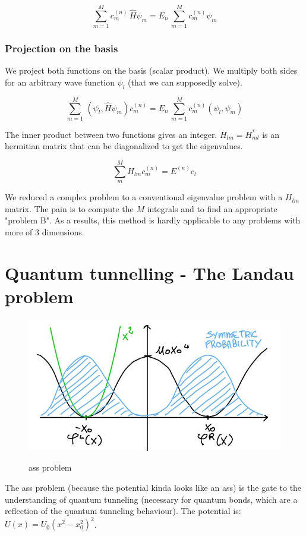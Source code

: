 		$$\sum_{m=1}^{M}c_m^{(n)}\,\hat{H}\psi_m=E_n\,\sum_{m=1}^{M}c_m^{(n)}\psi_m$$

		\subsubsection{Projection on the basis}
		We project both functions on the basis (scalar product).
		We multiply both sides for an arbitrary wave function $\psi_l$ (that we can supposedly solve).

		$$\sum_{m=1}^{M}\,(\psi_l,\hat{H}\psi_m)c_m^{(n)}=E_n\,\sum_{m=1}^{M}c_m^{(n)}(\psi_l,\psi_m)$$

		The inner product between two functions gives an integer.
		$H_{lm}=H_{ml}^*$ is an hermitian matrix that can be diagonalized to get the eigenvalues.

		$$\sum_{m}^{M}H_{lm}c_m^{(n)}=E^{(n)}c_l$$

		We reduced a complex problem to a conventional eigenvalue problem with a $H_{lm}$ matrix.
		The pain is to compute the $M$ integrals and to find an appropriate "problem B".
		As a results, this method is hardly applicable to any problems with more of 3 dimensions.

\section{Quantum tunnelling - The Landau problem}

\begin{figure}[htbp!]
	\centering
	\includegraphics[scale=0.30]{img_2}
	\label{fig:ass}
	\caption{ass problem}
\end{figure}

The ass problem (because the potential kinda looks like an ass) is the gate to the understanding of quantum tunneling (necessary for quantum bonds, which are a reflection of the quantum tunneling behaviour).
The potential is: $U(x)=U_0(x^2-x_0^2)^2$.

